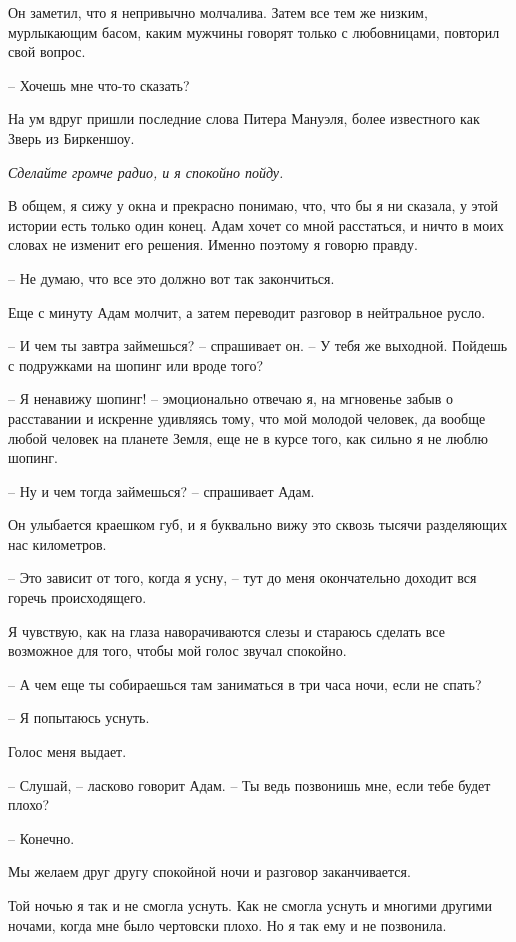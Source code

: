 \documentclass[
]{book}
\begin{document}
Он заметил, что я непривычно молчалива. Затем все тем же низким, мурлыкающим басом, каким мужчины говорят только с любовницами, повторил свой вопрос.

-- Хочешь мне что-то сказать?

На ум вдруг пришли последние слова Питера Мануэля, более известного как Зверь из Биркеншоу.

\emph{Сделайте громче радио, и я спокойно пойду.}

В общем, я сижу у окна и прекрасно понимаю, что, что бы я ни сказала, у этой истории есть только один конец. Адам хочет со мной расстаться, и ничто в моих словах не изменит его решения. Именно поэтому я говорю правду.

-- Не думаю, что все это должно вот так закончиться.

Еще с минуту Адам молчит, а затем переводит разговор в нейтральное русло.

-- И чем ты завтра займешься? -- спрашивает он. -- У тебя же выходной. Пойдешь с подружками на шопинг или вроде того?

-- Я ненавижу шопинг! -- эмоционально отвечаю я, на мгновенье забыв о расставании и искренне удивляясь тому, что мой молодой человек, да вообще любой человек на планете Земля, еще не в курсе того, как сильно я не люблю шопинг.

-- Ну и чем тогда займешься? -- спрашивает Адам.

Он улыбается краешком губ, и я буквально вижу это сквозь тысячи разделяющих нас километров.

-- Это зависит от того, когда я усну, -- тут до меня окончательно доходит вся горечь происходящего.

Я чувствую, как на глаза наворачиваются слезы и стараюсь сделать все возможное для того, чтобы мой голос звучал спокойно.

-- А чем еще ты собираешься там заниматься в три часа ночи, если не спать?

-- Я попытаюсь уснуть.

Голос меня выдает.

-- Слушай, -- ласково говорит Адам. -- Ты ведь позвонишь мне, если тебе будет плохо?

-- Конечно.

Мы желаем друг другу спокойной ночи и разговор заканчивается.

Той ночью я так и не смогла уснуть. Как не смогла уснуть и многими другими ночами, когда мне было чертовски плохо. Но я так ему и не позвонила.
\end{document}
